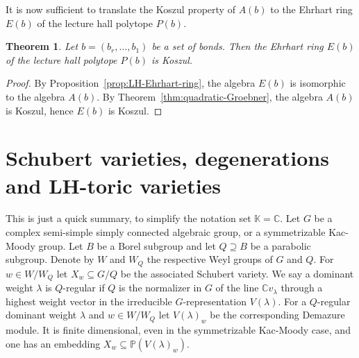 \documentclass[12pt, a4paper]{amsart}   	%
\numberwithin{equation}{section}
\theoremstyle{plain}
\newtheorem{theorem}{Theorem}[section]
\theoremstyle{definition}
\begin{document}
It is now sufficient to translate the Koszul property of $A(b)$ to the Ehrhart ring $E(b)$ of the lecture hall polytope $P(b)$.
\begin{theorem}\label{thm:Koszul-LH}
Let $b=(b_r,\ldots,b_1)$ be a set of bonds. Then the Ehrhart ring $E(b)$ of the lecture hall polytope $P(b)$ is Koszul.
\end{theorem}
\begin{proof}
By Proposition~\ref{prop:LH-Ehrhart-ring}, the algebra $E(b)$ is isomorphic to the algebra $A(b)$. By Theorem~\ref{thm:quadratic-Groebner}, the algebra $A(b)$ is Koszul, hence $E(b)$ is Koszul.
\end{proof} 

\section{Schubert varieties, degenerations and LH-toric varieties}\label{Sec:7}

This is just a quick summary, to simplify the notation set $\mathbb K=\mathbb C$. 
Let $G$ be a complex semi-simple simply connected algebraic group, or 
a symmetrizable Kac-Moody group. Let $B$ be a Borel subgroup and let $Q\supseteq B$ be a parabolic subgroup. 
Denote by $W$ and $W_Q$ the respective Weyl groups of $G$ and $Q$. For $w\in W/W_Q$ let $X_w\subseteq G/Q$ be the 
associated Schubert variety. We say a dominant weight $\lambda$ is $Q$-regular if $Q$ is the normalizer in $G$ of the line $\mathbb C v_\lambda$ through a highest 
weight vector in the irreducible $G$-representation $V(\lambda)$.
For a $Q$-regular dominant weight $\lambda$ and $w\in W/W_Q$ let $V(\lambda)_w$ be the corresponding Demazure module.
It is finite dimensional, even in the symmetrizable Kac-Moody case, and one has an embedding $X_w\subseteq \mathbb P(V(\lambda)_w)$.
\end{document}
